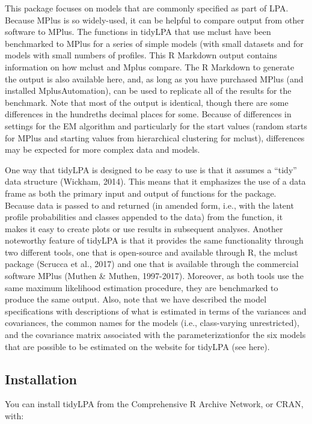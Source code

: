 \documentclass[man]{apa6}
\begin{document}
This package focuses on models that are commonly specified as part of LPA.
Because MPlus is so widely-used, it can be helpful to compare output from other
software to MPlus. The functions in tidyLPA that use mclust have been
benchmarked to MPlus for a series of simple models (with small datasets and for
models with small numbers of profiles. This R Markdown output contains
information on how mclust and Mplus compare. The R Markdown to generate the
output is also available here, and, as long as you have purchased MPlus (and
installed MplusAutomation), can be used to replicate all of the results for the
benchmark. Note that most of the output is identical, though there are some
differences in the hundreths decimal places for some. Because of differences in
settings for the EM algorithm and particularly for the start values (random
starts for MPlus and starting values from hierarchical clustering for mclust),
differences may be expected for more complex data and models.

One way that tidyLPA is designed to be easy to use is that it assumes a \enquote{tidy}
data structure (Wickham, 2014). This means that it emphasizes the use of a data
frame as both the primary input and output of functions for the package. Because
data is passed to and returned (in amended form, i.e., with the latent profile
probabilities and classes appended to the data) from the function, it makes it
easy to create plots or use results in subsequent analyses. Another noteworthy
feature of tidyLPA is that it provides the same functionality through two
different tools, one that is open-source and available through R, the mclust
package (Scrucca et al., 2017) and one that is available through the commercial
software MPlus (Muthen \& Muthen, 1997-2017). Moreover, as both tools use the
same maximum likelihood estimation procedure, they are benchmarked to produce
the same output. Also, note that we have described the model
specifications with descriptions of what is estimated in terms of the variances
and covariances, the common names for the models (i.e., class-varying
unrestricted), and the covariance matrix associated with the parameterizationfor
the six models that are possible to be estimated on the website for tidyLPA (see
here).

\hypertarget{installation}{%
\subsection{Installation}\label{installation}}

You can install tidyLPA from the Comprehensive R Archive Network, or CRAN, with:
\end{document}
